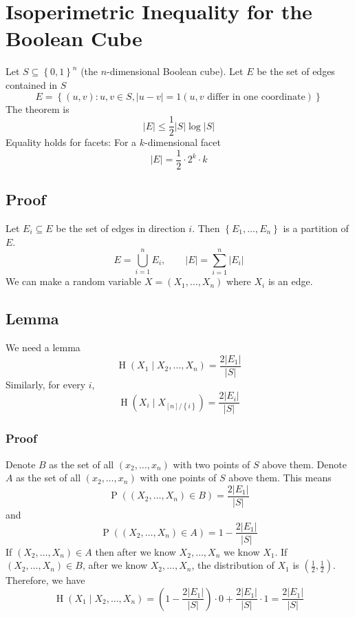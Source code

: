 \documentclass{article}
\begin{document}
\section{Isoperimetric Inequality for the Boolean Cube}

Let $S\subseteq\left\{0,1\right\}^n$ (the $n$-dimensional Boolean cube). Let $E$ be the set of edges contained in $S$
\[
E = \left\{\left(u,v\right) : u,v\in S, \lvert u-v \rvert =1 (u,v \text{ differ in one coordinate})\right\}
\]
The theorem is 
\[
\lvert E \rvert\leq \frac{1}{2} \lvert S\rvert \log \lvert S\rvert
\]
Equality holds for facets: For a $k$-dimensional facet 
\[
\lvert E \rvert= \frac{1}{2}\cdot 2^k \cdot k
\]

\subsection{Proof}
Let $E_i \subseteq E$ be the set of edges in direction $i$. Then $\left\{E_1,\ldots, E_n\right\}$ is a partition of $E$.
\[
E=\bigcup_{i=1}^{n}E_i,\qquad \lvert E\rvert = \sum_{i= 1 }^{n }\lvert E_i\rvert
\]
We can make a random variable $X=\left(X_1,\ldots, X_n\right)$ where $X_i$ is an edge.

\subsection{Lemma}

We need a lemma
\[
\operatorname{H}\left(X_1\mid X_2,\ldots, X_n\right) = \frac{2 \lvert E_1\rvert }{\lvert S\rvert}
\]
Similarly, for every $i$, 
\[
\operatorname{H}\left(X_i\mid X_{[n] / \left\{i\right\}}\right) = \frac{2 \lvert E_i\rvert }{\lvert S\rvert}
\]

\subsubsection{Proof}

Denote $B$ as the set of all $\left(x_2,\ldots,x_n\right)$ with two points of $S$ above them. Denote $A$ as the set of all $\left(x_2,\ldots, x_n\right)$ with one points of $S$ above them. This means 
\[
\operatorname{P}\left(\left(X_2,\ldots,X_n\right)\in B\right) = \frac{2 \lvert E_1\rvert}{\lvert S \rvert}
\]
and 
\[
\operatorname{P}\left(\left(X_2,\ldots,X_n\right)\in A\right) = 1-\frac{2 \lvert E_1\rvert}{\lvert S \rvert}
\]
If $\left(X_2,\ldots,X_n\right)\in A$ then after we know $X_2,\ldots, X_n$ we know $X_1$. If $\left(X_2,\ldots,X_n\right)\in B$, after we know $X_2,\ldots, X_n$, the distribution of $X_1$ is $\left(\frac{1}{2}, \frac{1}{2}\right)$. Therefore, we have 
\[
\operatorname{H}\left(X_1\mid X_2,\ldots, X_n\right) = \left(1- \frac{2 \lvert E_1\rvert}{\lvert S \rvert}\right)\cdot 0 + \frac{2 \lvert E_1\rvert}{\lvert S \rvert}\cdot 1 = \frac{2 \lvert E_1\rvert}{\lvert S \rvert}
\]
\end{document}
